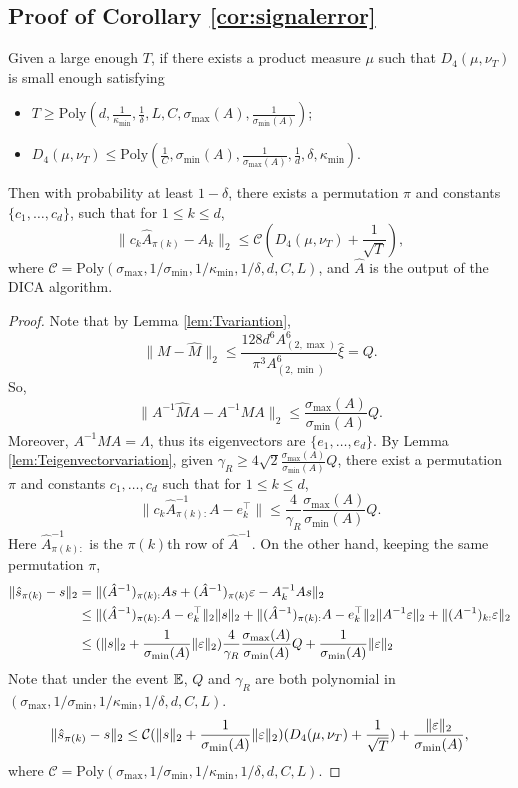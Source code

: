 \subsection{Proof of Corollary \ref{cor:signalerror}}

 Given a large enough $T$, if there exists a product measure $\mu$  such that  $D_4(\mu, \nu_T)$ is small enough satisfying
\begin{itemize}
\vspace{-3mm}
\item $T \ge \text{Poly}(d, \frac{1}{\kappa_{\min}}, \frac{1}{\delta}, L, C, \sigma_{\max}(A), \frac{1}{\sigma_{\min}(A)})$;
\item $D_4(\mu, \nu_T) \le \text{Poly}(\frac{1}{C},  \sigma_{\min}(A),  \frac{1}{\sigma_{\max}(A)},\frac{1}{d}, \delta, \kappa_{\min})$.
\end{itemize}
\vspace{-2mm}
Then with probability at least $1-\delta$, there exists a permutation $\pi$ and constants $\{c_1,\ldots,c_d\}$, such that for $1\le k\le d$,
\[
\| c_k\hat{A}_{\pi(k)} - A_k\|_2 \le \mathcal{C}\left(D_4(\mu, \nu_T)+\frac{1}{\sqrt{T}}\right),
\]
where $\mathcal{C} = \text{Poly}(\sigma_{\max}, 1/\sigma_{\min}, 1/\kappa_{\min},1/\delta, d, C, L)$, and $\hat{A}$ is the output of the DICA algorithm.
\begin{proof}
Note that by Lemma \ref{lem:Tvariantion},
\[
\|M - \hat{M}\|_2 \le  \frac{128d^6A^6_{(2,\max)}}{\pi^3 A^6_{(2,\min)}}\hat{\xi} = Q.
\]
So, 
\[
\|A^{-1}\hat{M}A -A^{-1}MA \|_2 \le \frac{\sigma_{\max}(A)}{\sigma_{\min}(A)}Q.
\]
Moreover, $A^{-1}MA = \Lambda$, thus its eigenvectors are $\{e_1,\ldots,e_d\}$.
By Lemma \ref{lem:Teigenvectorvariation}, given $\gamma_R \ge 4\sqrt{2} \frac{\sigma_{\max}(A)}{\sigma_{\min}(A)}Q$, there exist a permutation $\pi$ and constants ${c_1,\ldots,c_d}$ such that for $1\le k\le d$,
\[
\|c_k\hat{A}^{-1}_{\pi(k):}A - e_k^{\top}\| \le \frac{4}{\gamma_R}\frac{\sigma_{\max}(A)}{\sigma_{\min}(A)}Q.
\]
Here $\hat{A}^{-1}_{\pi(k):}$ is the $\pi(k)$th row of $\hat{A}^{-1}$.
On the other hand, keeping the same permutation $\pi$,
\begin{align*}
\| \hat{s}_{\pi(k)} - s \|_2 & = \|(\hat{A}^{-1})_{\pi(k):}As + (\hat{A}^{-1})_{\pi(k)}\varepsilon - A^{-1}_kAs \|_2 \\
& \le \|(\hat{A}^{-1})_{\pi(k):}A - e_k^{\top}\|_2\|s\|_2 + \|(\hat{A}^{-1})_{\pi(k):}A - e_k^{\top}\|_2\|A^{-1}\varepsilon\|_2 + \|(A^{-1})_{k:}\varepsilon\|_2 \\
& \le (\|s\|_2+\frac{1}{\sigma_{\min}(A)}\|\varepsilon\|_2)\frac{4}{\gamma_R}\frac{\sigma_{\max}(A)}{\sigma_{\min}(A)}Q + \frac{1}{\sigma_{\min}(A)}\|\varepsilon\|_2
\end{align*}  
Note that under the event $\mathbb{E}$,  $Q$ and $\gamma_R$ are both polynomial in $(\sigma_{\max}, 1/\sigma_{\min}, 1/\kappa_{\min},1/\delta, d, C, L)$. 
\[
\| \hat{s}_{\pi(k)} - s \|_2 \le \mathcal{C}(\|s\|_2+\frac{1}{\sigma_{\min}(A)}\|\varepsilon\|_2)(D_4(\mu,\nu_T)+\frac{1}{\sqrt{T}})+\frac{\|\varepsilon\|_2}{\sigma_{\min}(A)},
\]
where $\mathcal{C} = \text{Poly}(\sigma_{\max}, 1/\sigma_{\min}, 1/\kappa_{\min},1/\delta, d, C, L)$.
\end{proof}
